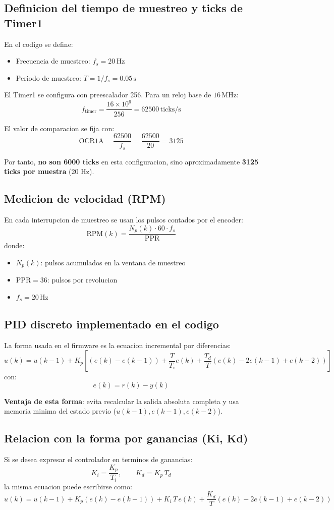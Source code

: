 \documentclass[journal, onecolumn]{IEEEtran}
\begin{document}
\subsection{Definicion del tiempo de muestreo y ticks de Timer1}
En el codigo se define:
\begin{itemize}
  \item Frecuencia de muestreo: $f_s = 20\,\mathrm{Hz}$
  \item Periodo de muestreo: $T = 1/f_s = 0.05\,\mathrm{s}$
\end{itemize}

El Timer1 se configura con preescalador 256.
Para un reloj base de $16\,\mathrm{MHz}$:
\[
 f_{\text{timer}} = \frac{16\times10^6}{256} = 62500\,\mathrm{ticks/s}
\]

El valor de comparacion se fija con:
\[
\text{OCR1A} = \frac{62500}{f_s} = \frac{62500}{20} = 3125
\]

Por tanto, \textbf{no son 6000 ticks} en esta configuracion, sino aproximadamente
\textbf{3125 ticks por muestra} (20 Hz).

\subsection{Medicion de velocidad (RPM)}
En cada interrupcion de muestreo se usan los pulsos contados por el encoder:
\[
\mathrm{RPM}(k)=\frac{N_p(k)\cdot 60\cdot f_s}{\mathrm{PPR}}
\]
donde:
\begin{itemize}
  \item $N_p(k)$: pulsos acumulados en la ventana de muestreo
  \item $\mathrm{PPR}=36$: pulsos por revolucion
  \item $f_s=20\,\mathrm{Hz}$
\end{itemize}

\subsection{PID discreto implementado en el codigo}
La forma usada en el firmware es la ecuacion incremental por diferencias:
\[
 u(k)=u(k-1)+K_p\left[(e(k)-e(k-1)) + \frac{T}{T_i}e(k) + \frac{T_d}{T}(e(k)-2e(k-1)+e(k-2))\right]
\]
con:
\[
 e(k)=r(k)-y(k)
\]

\textbf{Ventaja de esta forma}: evita recalcular la salida absoluta completa y usa memoria
minima del estado previo ($u(k-1), e(k-1), e(k-2)$).

\subsection{Relacion con la forma por ganancias (Ki, Kd)}
Si se desea expresar el controlador en terminos de ganancias:
\[
K_i=\frac{K_p}{T_i},\qquad K_d=K_p\,T_d
\]
la misma ecuacion puede escribirse como:
\[
 u(k)=u(k-1)+K_p(e(k)-e(k-1)) + K_i\,T\,e(k) + \frac{K_d}{T}(e(k)-2e(k-1)+e(k-2))
\]
\end{document}
